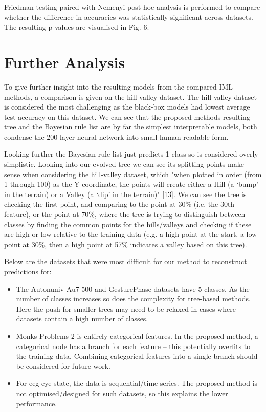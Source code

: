 Friedman testing paired with Nemenyi post-hoc analysis is performed to compare whether the difference in accuracies was statistically significant across datasets. The resulting p-values are visualised in Fig. 6.
\section{Further Analysis}
To give further insight into the resulting models from the compared IML methods, a comparison is given on the hill-valley dataset. The hill-valley dataset is considered the most challenging as the black-box models had lowest average test accuracy on this dataset. We can see that the proposed method\textquotesingle s resulting tree and the Bayesian rule list are by far the simplest interpretable models, both condense the 200 layer neural-network into small human readable form.

Looking further the Bayesian rule list just predicts 1 class so is considered overly simplistic. Looking into our evolved tree we can see its splitting points make sense when considering the hill-valley dataset, which "when plotted in order (from 1 through 100) as the Y coordinate, the points will create either a Hill (a `bump' in the terrain) or a Valley (a `dip' in the terrain)" [13]. We can see the tree is checking the first point, and comparing to the point at 30\% (i.e. the 30th feature), or the point at 70\%, where the tree is trying to distinguish between classes by finding the common points for the hills/valleys and checking if these are high or low relative to the training data (e.g. a high point at the start, a low point at 30\%, then a high point at 57\% indicates a valley based on this tree).

Below are the datasets that were most difficult for our method to reconstruct predictions for:
\begin{itemize}
\item The Autonuniv-Au7-500 and GesturePhase datasets have 5 classes. As the number of classes increases so does the complexity for tree-based methods. Here the push for smaller trees may need to be relaxed in cases where datasets contain a high number of classes.
\item Monks-Problems-2 is entirely categorical features. In the proposed method, a categorical node has a branch for each feature -- this potentially overfits to the training data. Combining categorical features into a single branch should be considered for future work.
\item For eeg-eye-state, the data is sequential/time-series. The proposed method is not optimised/designed for such datasets, so this explains the lower performance.
\end{itemize}
